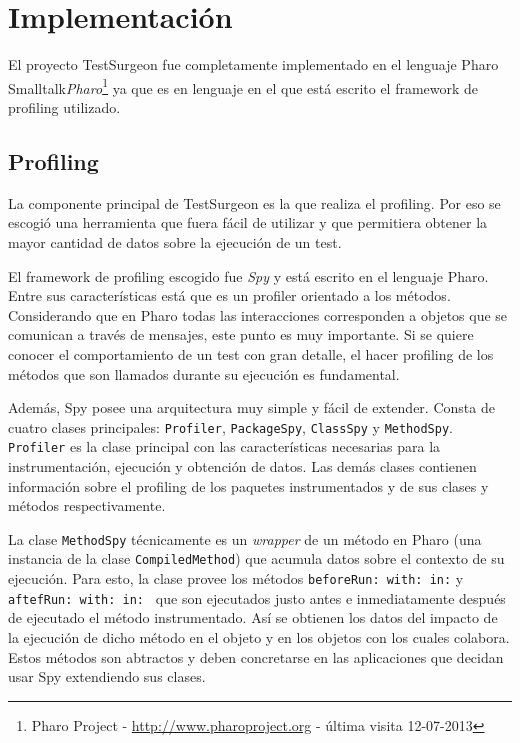 \chapter{Implementación}

\par El proyecto TestSurgeon fue completamente implementado en el lenguaje Pharo Smalltalk\emph{Pharo}\footnote{Pharo Project - \url{http://www.pharoproject.org} - última visita 12-07-2013 } ya que es en lenguaje en el que está escrito el framework de profiling utilizado. 

\section{Profiling}
\par La componente principal de TestSurgeon es la que realiza el profiling. Por eso se escogió una herramienta que fuera fácil de utilizar y que permitiera obtener la mayor cantidad de datos sobre la ejecución de un test.
\par El framework de profiling escogido fue \emph{Spy} y está escrito en el lenguaje Pharo. Entre sus características está que es un profiler orientado a los métodos. Considerando que en Pharo todas las interacciones corresponden a objetos que se comunican a través de mensajes, este punto es muy importante. Si se quiere conocer el comportamiento de un test con gran detalle, el hacer profiling de los métodos que son llamados durante su ejecución es fundamental. 
\par Además, Spy posee una arquitectura muy simple y fácil de extender. Consta de cuatro clases principales: {\tt Profiler}, {\tt PackageSpy}, {\tt ClassSpy} y {\tt MethodSpy}. {\tt Profiler} es la clase principal con las características necesarias para la instrumentación, ejecución y obtención de datos. Las demás clases contienen información sobre el profiling de los paquetes instrumentados y de sus clases y métodos respectivamente. 
\par La clase {\tt MethodSpy} técnicamente es un \emph{wrapper} de un método en Pharo (una instancia de la clase {\tt CompiledMethod}) que acumula datos sobre el contexto de su ejecución. Para esto, la clase provee los métodos {\tt beforeRun: with: in:} y {\tt aftefRun: with: in: } que son ejecutados justo antes e inmediatamente después de ejecutado el método instrumentado. Así se obtienen los datos del impacto de la ejecución de dicho método en el objeto y en los objetos con los cuales colabora. Estos métodos son abtractos y deben concretarse en las aplicaciones que decidan usar Spy extendiendo sus clases. 

